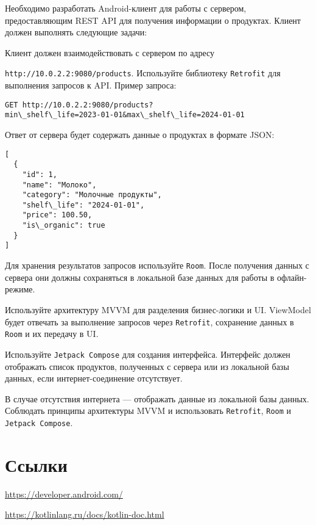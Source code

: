 \documentclass[a4paper,12pt]{article}
\begin{document}
Необходимо разработать Android-клиент для работы с сервером, предоставляющим REST API для получения информации о продуктах. Клиент должен выполнять следующие задачи:

Клиент должен взаимодействовать с сервером по адресу 

\texttt{http://10.0.2.2:9080/products}. Используйте библиотеку \texttt{Retrofit} для выполнения запросов к API. Пример запроса:

\begin{verbatim}
GET http://10.0.2.2:9080/products?
min\_shelf\_life=2023-01-01&max\_shelf\_life=2024-01-01
\end{verbatim}

Ответ от сервера будет содержать данные о продуктах в формате JSON:

\begin{verbatim}
[
  {
    "id": 1,
    "name": "Молоко",
    "category": "Молочные продукты",
    "shelf\_life": "2024-01-01",
    "price": 100.50,
    "is\_organic": true
  }
]
\end{verbatim}

Для хранения результатов запросов используйте \texttt{Room}. После получения данных с сервера они должны сохраняться в локальной базе данных для работы в офлайн-режиме.

Используйте архитектуру MVVM для разделения бизнес-логики и UI. ViewModel будет отвечать за выполнение запросов через \texttt{Retrofit}, сохранение данных в \texttt{Room} и их передачу в UI.

Используйте \texttt{Jetpack Compose} для создания интерфейса. Интерфейс должен отображать список продуктов, полученных с сервера или из локальной базы данных, если интернет-соединение отсутствует.

В случае отсутствия интернета — отображать данные из локальной базы данных.
Соблюдать принципы архитектуры MVVM и использовать \texttt{Retrofit}, \texttt{Room} и \texttt{Jetpack Compose}.


\section*{Ссылки}

\noindent\url{https://developer.android.com/}

\noindent\url{https://kotlinlang.ru/docs/kotlin-doc.html}
\end{document}
